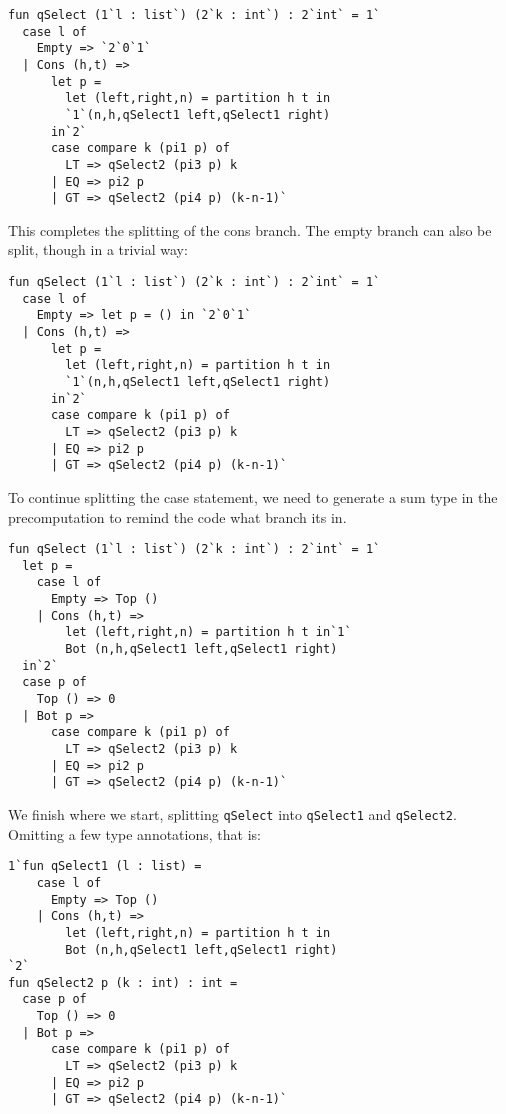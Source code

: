 \begin{lstlisting} 
fun qSelect (1`l : list`) (2`k : int`) : 2`int` = 1`
  case l of
    Empty => `2`0`1`
  | Cons (h,t) => 
      let p =
        let (left,right,n) = partition h t in
        `1`(n,h,qSelect1 left,qSelect1 right)
      in`2`
      case compare k (pi1 p) of
        LT => qSelect2 (pi3 p) k
      | EQ => pi2 p
      | GT => qSelect2 (pi4 p) (k-n-1)`
\end{lstlisting}

This completes the splitting of the cons branch.  
The empty branch can also be split, though in a trivial way:

\begin{lstlisting} 
fun qSelect (1`l : list`) (2`k : int`) : 2`int` = 1`
  case l of
    Empty => let p = () in `2`0`1`
  | Cons (h,t) => 
      let p =
        let (left,right,n) = partition h t in
        `1`(n,h,qSelect1 left,qSelect1 right)
      in`2`
      case compare k (pi1 p) of
        LT => qSelect2 (pi3 p) k
      | EQ => pi2 p
      | GT => qSelect2 (pi4 p) (k-n-1)`
\end{lstlisting}



To continue splitting the case statement, we need to generate a sum type in the precomputation
to remind the code what branch its in.

\begin{lstlisting} 
fun qSelect (1`l : list`) (2`k : int`) : 2`int` = 1`
  let p = 
    case l of
      Empty => Top ()
    | Cons (h,t) =>
        let (left,right,n) = partition h t in`1`
        Bot (n,h,qSelect1 left,qSelect1 right)
  in`2`
  case p of 
    Top () => 0
  | Bot p => 
      case compare k (pi1 p) of
        LT => qSelect2 (pi3 p) k
      | EQ => pi2 p
      | GT => qSelect2 (pi4 p) (k-n-1)`
\end{lstlisting}

We finish where we start, splitting \texttt{qSelect} into
\texttt{qSelect1} and \texttt{qSelect2}.  
Omitting a few type annotations, that is:

\begin{lstlisting} 
1`fun qSelect1 (l : list) = 
    case l of
      Empty => Top ()
    | Cons (h,t) =>
        let (left,right,n) = partition h t in
        Bot (n,h,qSelect1 left,qSelect1 right)
`2`
fun qSelect2 p (k : int) : int = 
  case p of 
    Top () => 0
  | Bot p => 
      case compare k (pi1 p) of
        LT => qSelect2 (pi3 p) k
      | EQ => pi2 p
      | GT => qSelect2 (pi4 p) (k-n-1)`
\end{lstlisting}

